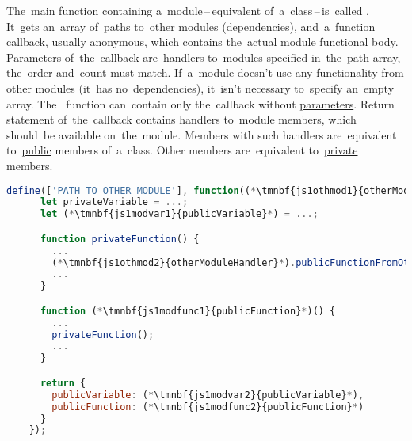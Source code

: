 \enlargethispage{20mm}
\thispagestyle{empty}
\label{amdsyntax}
The~main function containing a~module\,--\,equivalent of~a~class\,--\,is~called .
It~gets an~array of~paths to~other modules (dependencies), and~a~function callback, usually anonymous, which contains the~actual module functional body.
\hyperref[parameterargument]{Parameters} of~the~callback are~handlers to~modules specified in~the~path array, the~order and~count must match.
If~a~module doesn't use any functionality from other modules (it~has no~dependencies), it~isn't necessary to~specify an~empty array.
The~ function can~contain only the~callback without \hyperref[parameterargument]{parameters}.
Return statement of~the~callback contains handlers to~module members, which should~be available on~the~module.
Members with such handlers are~equivalent to~\hyperref[javapublic]{public} members of~a~class.
Other members are~equivalent to~\hyperref[javaprivate]{private} members.
\newpage

\begin{lstlisting}[language=JavaScript]
    define(['PATH_TO_OTHER_MODULE'], function((*\tmnbf{js1othmod1}{otherModuleHandler}*)) {
      let privateVariable = ...;
      let (*\tmnbf{js1modvar1}{publicVariable}*) = ...;

      function privateFunction() {
        ...
        (*\tmnbf{js1othmod2}{otherModuleHandler}*).publicFunctionFromOtherModule();
        ...
      }

      function (*\tmnbf{js1modfunc1}{publicFunction}*)() {
        ...
        privateFunction();
        ...
      }

      return {
        publicVariable: (*\tmnbf{js1modvar2}{publicVariable}*),
        publicFunction: (*\tmnbf{js1modfunc2}{publicFunction}*)
      }
    });
\end{lstlisting}

